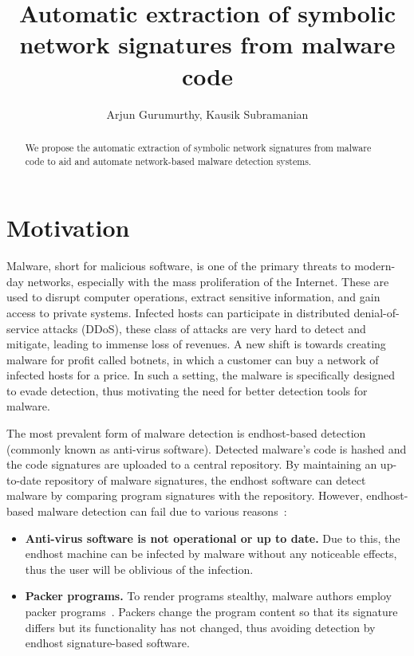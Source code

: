 \documentclass[twocolumn, 11pt]{paper}
\title{Automatic extraction of symbolic network signatures from malware code}
\author{Arjun Gurumurthy, Kausik Subramanian}
\begin{document}
\maketitle

\begin{abstract}
We propose the automatic extraction of symbolic network signatures from malware code to aid and automate network-based malware detection systems.
\end{abstract}

\section{Motivation}
Malware, short for malicious software, 
is one of the primary threats to modern-day networks, especially
with the mass proliferation of the Internet. These are used to 
disrupt computer operations, extract sensitive information, and 
gain access to private systems.  Infected hosts can participate 
in distributed denial-of-service attacks (DDoS), these class of 
attacks are very hard to detect and mitigate, leading to immense
loss of revenues. A new shift is towards creating malware for 
profit called botnets, in which a customer can buy a network of
infected hosts for a price. In such a setting, the malware is
specifically designed to evade detection, thus motivating the need
for better detection tools for malware. 

The most prevalent form of malware detection is endhost-based detection
(commonly known as anti-virus software). Detected malware's code is hashed
and the code signatures are uploaded to a central repository. By maintaining
an up-to-date repository of malware signatures, the endhost software can
detect malware by comparing program signatures with the repository. However, 
endhost-based malware detection can fail due to various reasons~\cite{networksig}:
\begin{itemize}
	\item \textbf{Anti-virus software is not operational or up to date.} 
	Due to this, the endhost machine can be infected by malware without any
	noticeable effects, thus the user will be oblivious of the infection.
	\item \textbf{Packer programs.} To render programs stealthy, malware authors
	employ packer programs~\cite{packer}. Packers change the program content so that
	its signature differs but its functionality has not changed, thus avoiding
	detection by endhost signature-based software.
\end{itemize}
\end{document}
